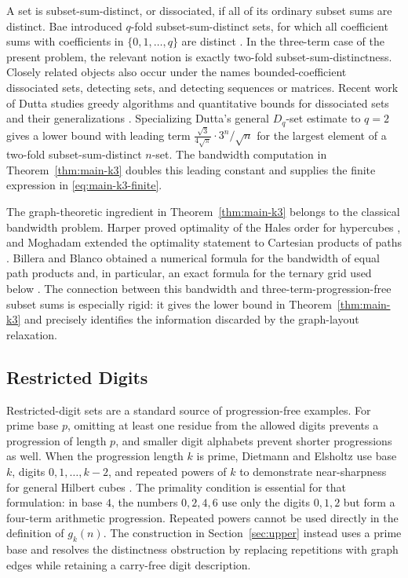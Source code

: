 \documentclass[11pt]{article}
\numberwithin{equation}{section}
\theoremstyle{definition}
\theoremstyle{remark}
\begin{document}
A set is subset-sum-distinct, or dissociated, if all of its ordinary subset sums are distinct. Bae introduced $q$-fold subset-sum-distinct sets, for which all coefficient sums with coefficients in $\{0,1,\ldots,q\}$ are distinct \cite{Bae2002}. In the three-term case of the present problem, the relevant notion is exactly two-fold subset-sum-distinctness. Closely related objects also occur under the names bounded-coefficient dissociated sets, detecting sets, and detecting sequences or matrices. Recent work of Dutta studies greedy algorithms and quantitative bounds for dissociated sets and their generalizations \cite{Dutta2026}. Specializing Dutta's general $D_q$-set estimate to $q=2$ gives a lower bound with leading term $\frac{\sqrt3}{4\sqrt\pi}\cdot3^n/\sqrt n$ for the largest element of a two-fold subset-sum-distinct $n$-set. The bandwidth computation in Theorem~\ref{thm:main-k3} doubles this leading constant and supplies the finite expression in \eqref{eq:main-k3-finite}.

\bigskip
\noindent
The graph-theoretic ingredient in Theorem~\ref{thm:main-k3} belongs to the classical bandwidth problem. Harper proved optimality of the Hales order for hypercubes \cite{Harper1966}, and Moghadam extended the optimality statement to Cartesian products of paths \cite{Moghadam2005}. Billera and Blanco obtained a numerical formula for the bandwidth of equal path products and, in particular, an exact formula for the ternary grid used below \cite{BilleraBlanco2013}. The connection between this bandwidth and three-term-progression-free subset sums is especially rigid: it gives the lower bound in Theorem~\ref{thm:main-k3} and precisely identifies the information discarded by the graph-layout relaxation.

\subsection{Restricted Digits}

Restricted-digit sets are a standard source of progression-free examples. For prime base $p$, omitting at least one residue from the allowed digits prevents a progression of length $p$, and smaller digit alphabets prevent shorter progressions as well. When the progression length $k$ is prime, Dietmann and Elsholtz use base $k$, digits $0,1,\ldots,k-2$, and repeated powers of $k$ to demonstrate near-sharpness for general Hilbert cubes \cite{DietmannElsholtz2015}. The primality condition is essential for that formulation: in base $4$, the numbers $0,2,4,6$ use only the digits $0,1,2$ but form a four-term arithmetic progression. Repeated powers cannot be used directly in the definition of $g_k(n)$. The construction in Section~\ref{sec:upper} instead uses a prime base and resolves the distinctness obstruction by replacing repetitions with graph edges while retaining a carry-free digit description.
\end{document}
